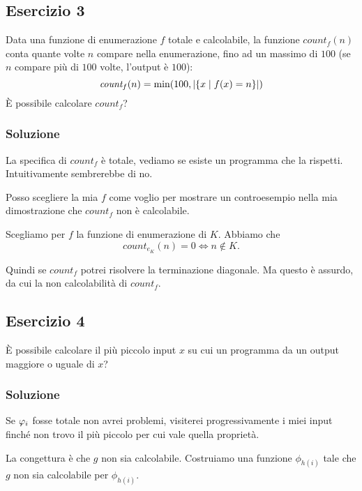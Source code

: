 \subsection{Esercizio 3}

Data una funzione di enumerazione $f$ totale e calcolabile, la funzione $\textit{count}_{f}(n)$ conta quante
volte $n$ compare nella enumerazione, fino ad un massimo di $100$ (se $n$ compare più di $100$ volte, l’output
è $100$):
\begin{equation*}
    \textit{count}_{f}(n) = \min(100,|\{x \mid f(x) = n\}|)
\end{equation*}
È possibile calcolare $\textit{count}_{f}$?

\subsubsection{Soluzione}

La specifica di $\textit{count}_{f}$ è totale, vediamo se esiste un programma che la rispetti.
Intuitivamente sembrerebbe di no.

Posso scegliere la mia $f$ come voglio per mostrare un controesempio nella mia dimostrazione che
$\textit{count}_{f}$ non è calcolabile.

Scegliamo per $f$ la funzione di enumerazione di $K$. Abbiamo che
\begin{equation*}
    count_{e_{K}}(n) = 0 \iff n \notin K.
\end{equation*}

Quindi se $\textit{count}_{f}$ potrei risolvere la terminazione diagonale. Ma questo è assurdo, da
cui la non calcolabilità di $\textit{count}_{f}$.

\subsection{Esercizio 4}

È possibile  calcolare  il  più  piccolo  input $x$ su cui un programma da un output maggiore o
uguale di $x$?

\subsubsection{Soluzione}

Se $\varphi_{i}$ fosse totale non avrei problemi, visiterei progressivamente i miei input finché non trovo
il più piccolo per cui vale quella proprietà.

La congettura è che $g$ non sia calcolabile. Costruiamo una funzione $\phi_{h(i)}$ tale che $g$ non sia
calcolabile per $\phi_{h(i)}$.

